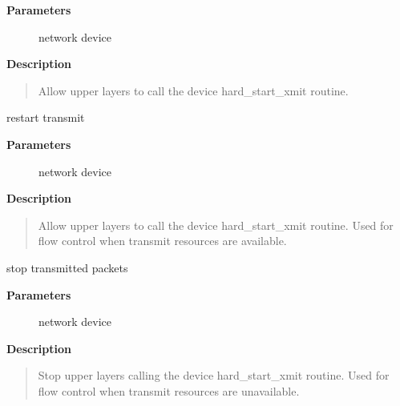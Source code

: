 \documentclass[a4paper,8pt,english]{sphinxmanual}
\begin{document}
\textbf{Parameters}
\begin{description}
\item[{}] \leavevmode
network device

\end{description}

\textbf{Description}
\begin{quote}

Allow upper layers to call the device hard\_start\_xmit routine.
\end{quote}

\begin{fulllineitems}
\label{networking/kapi:c.netif_wake_queue}
restart transmit

\end{fulllineitems}


\textbf{Parameters}
\begin{description}
\item[{}] \leavevmode
network device

\end{description}

\textbf{Description}
\begin{quote}

Allow upper layers to call the device hard\_start\_xmit routine.
Used for flow control when transmit resources are available.
\end{quote}

\begin{fulllineitems}
\label{networking/kapi:c.netif_stop_queue}
stop transmitted packets

\end{fulllineitems}


\textbf{Parameters}
\begin{description}
\item[{}] \leavevmode
network device

\end{description}

\textbf{Description}
\begin{quote}

Stop upper layers calling the device hard\_start\_xmit routine.
Used for flow control when transmit resources are unavailable.
\end{quote}
\end{document}
